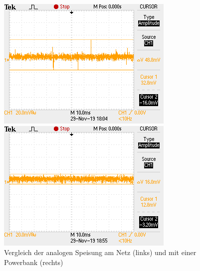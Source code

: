 \begin{figure} [H]
\begin{minipage}[c]{0.5\textwidth}
\includegraphics[width=\textwidth]{graphics/Speisung_Netz_Analog.png}
\end{minipage}
\begin{minipage}[c]{0.5\textwidth}
\includegraphics[width=\textwidth]{graphics/Speisung_PB_Analog.png}
\end{minipage}
\caption{Vergleich der analogen Speisung am Netz (links) und mit einer Powerbank (rechts)}
\label{fig:analogspeisung}
\end{figure} 

